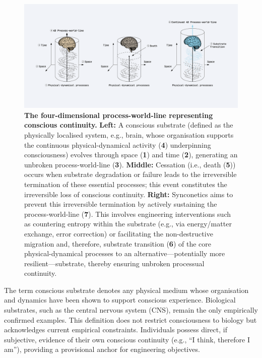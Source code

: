 \documentclass[10pt]{article}
\begin{document}
\begin{sloppypar}
  \begin{figure}[ht!]
    \centering
    \includegraphics[width=\textwidth]{figures/4D-process-world-line-ending.png}
    \caption[The four-dimensional process-world-line representing conscious continuity]{\textbf{The four-dimensional process-world-line representing conscious continuity.} \textbf{Left:} A conscious substrate (defined as the physically localised system, e.g., brain, whose organisation supports the continuous physical-dynamical activity (\textbf{4}) underpinning consciousness) evolves through space (\textbf{1}) and time (\textbf{2}), generating an unbroken process-world-line (\textbf{3}). \textbf{Middle:} Cessation (i.e., death (\textbf{5})) occurs when substrate degradation or failure leads to the irreversible termination of these essential processes; this event constitutes the irreversible loss of conscious continuity. \textbf{Right:} Synconetics aims to prevent this irreversible termination by actively sustaining the process-world-line (\textbf{7}). This involves engineering interventions such as countering entropy within the substrate (e.g., via energy/matter exchange, error correction) or facilitating the non-destructive migration and, therefore, substrate transition (\textbf{6}) of the core physical-dynamical processes to an alternative—potentially more resilient—substrate, thereby ensuring unbroken processual continuity.}
    \label{fig:process-world-line-ending}
  \end{figure}

  The term conscious substrate denotes any physical medium whose organisation and dynamics have been shown to support conscious experience. Biological substrates, such as the central nervous system (CNS), remain the only empirically confirmed examples. This definition does not restrict consciousness to biology but acknowledges current empirical constraints. Individuals possess direct, if subjective, evidence of their own conscious continuity (e.g., “I think, therefore I am”), providing a provisional anchor for engineering objectives.


\end{sloppypar}
\end{document}
